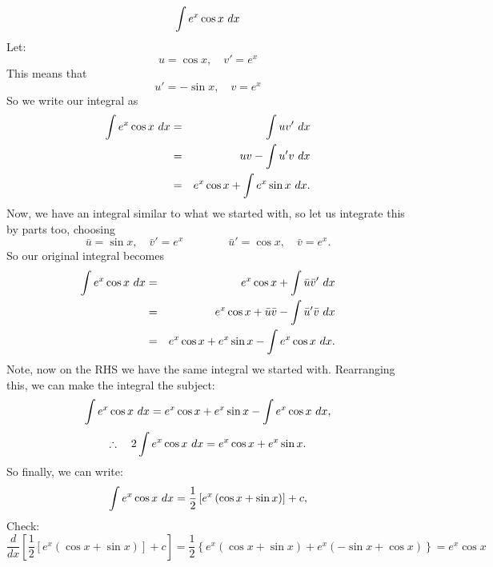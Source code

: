 \begin{example}
\[\int e^x\cos x\ dx\]
Let:
\[u=\cos x,\quad v'=e^x\]This means that\[u'=-\sin x,\quad v=e^x\]
So we write our integral as
\begin{eqnarray*}
\int e^x\cos x\ dx &=& \int uv'\ dx\\
&=& uv-\int u'v\ dx \\
&=& e^x\cos x + \int e^x\sin x\ dx.
\end{eqnarray*}
Now, we have an integral similar to what we started with, so let us integrate this by parts too, choosing
\[\bar{u}=\sin x,\quad \bar{v}'=e^x \quad\quad\quad\quad \bar{u}'=\cos x,\quad \bar{v}=e^x.\]
So our original integral becomes
\begin{eqnarray*}
\int e^x\cos x\ dx &=&e^x\cos x + \int \bar{u}\bar{v}'\ dx\\
&=&e^x\cos x +\bar{u}\bar{v}-\int\bar{u}'\bar{v}\ dx \\
&=& e^x\cos x+ e^x\sin x-\int e^x\cos x\ dx.
\end{eqnarray*}
Note, now on the RHS we have the same integral we started with. Rearranging this, we can make the integral the subject:
\[\int e^x\cos x\ dx  = e^x\cos x+ e^x\sin x-\int e^x\cos x\ dx,\]
\[\therefore \quad 2\int e^x\cos x\ dx  = e^x\cos x+ e^x\sin x.\]
So finally, we can write:
\[\int e^x\cos x\ dx  = \frac{1}{2}\left[ e^x\left(\cos x+ \sin x\right)\right] + c,\]
Check:
\[\frac{d}{dx}\left[\frac{1}{2}\left[ e^x\left(\cos x+ \sin x\right)\right] + c \right] =\frac{1}{2}\left\{e^x(\cos x+\sin x)+e^x(-\sin x+\cos x)\right\}=e^x\cos x \]
\end{example}


